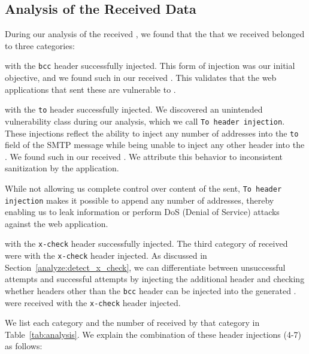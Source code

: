 \subsection{Analysis of the Received \Email Data}
During our analysis of the received \emails, we found that the \emails that we received belonged to three categories:

\Emails with the \texttt{bcc} header successfully injected. This form
of injection was our initial objective, and we found
\ehibcc such \emails in our received \emails. This validates that the
web applications that sent these \emails are vulnerable to \ehi.
	
\Emails with the \texttt{to} header successfully injected. We
discovered an unintended vulnerability class during our analysis,
which we call \texttt{To~header injection}. These injections reflect
the ability to inject any number of \email addresses into the
\texttt{to} field of the SMTP message while being unable to inject any
other header into the \emails. We found \ehito such \emails in our
received \emails. We attribute this behavior to inconsistent
sanitization by the application.

While not allowing us complete control over content of the \emails
sent, \texttt{To header injection} makes it possible to append any
number of \email addresses, thereby enabling us to leak information or
perform DoS (Denial of Service) attacks against the web application.
	
\Emails with the \texttt{x-check} header successfully injected. The
third category of \emails received were \emails with the
\texttt{x-check} header injected. As discussed in
Section~\ref{analyze:detect_x_check}, we can differentiate between
unsuccessful attempts and successful attempts by injecting the
additional header and checking whether headers other than the
\texttt{bcc} header can be injected into the generated \email.
\ehixcheck \emails were received with the \texttt{x-check} header
injected.

We list each category and the number of \emails received by that
category in Table~\ref{tab:analysis}. We explain the combination of
these header injections (4-7) as follows:



